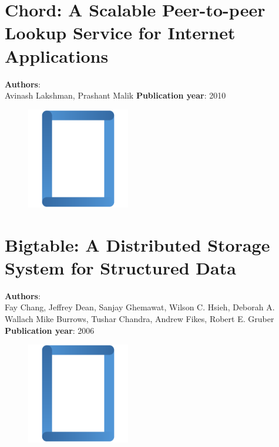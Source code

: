 \documentclass[11pt,fleqn]{book} %
\begin{document}
\chapter{Chord: A Scalable Peer-to-peer Lookup Service for Internet Applications}
\vspace*{-7mm}
\Large \textbf{Authors}: \\
Avinash Lakshman, Prashant Malik
\newline\newline
\textbf{Publication year}: 2010
\begin{figure}[b]
    \centering
    \includegraphics[width=0.4\textwidth]{distributed-systems-rectangle-blue.pdf}
\end{figure}


\chapter{Bigtable: A Distributed Storage System for Structured Data}
\vspace*{-7mm}
\Large \textbf{Authors}: \\
Fay Chang, Jeffrey Dean, Sanjay Ghemawat, Wilson C. Hsieh, Deborah A. Wallach Mike Burrows, Tushar Chandra, Andrew Fikes, Robert E. Gruber
\newline\newline
\textbf{Publication year}: 2006
\begin{figure}[b]
    \centering
    \includegraphics[width=0.4\textwidth]{distributed-systems-rectangle-blue.pdf}
\end{figure}

\end{document}
